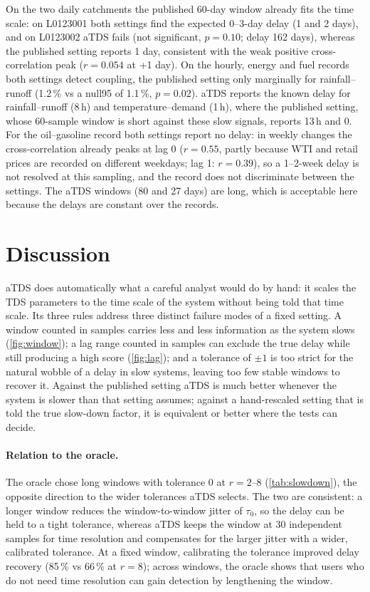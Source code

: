 \documentclass[11pt,a4paper]{article}
\begin{document}
On the two daily catchments the published 60-day window already fits the time scale: on L0123001 both settings find the expected 0--3-day delay (1 and 2 days), and on L0123002 aTDS fails (not significant, $p = 0.10$; delay 162 days), whereas the published setting reports 1 day, consistent with the weak positive cross-correlation peak ($r = 0.054$ at +1 day). On the hourly, energy and fuel records both settings detect coupling, the published setting only marginally for rainfall--runoff (1.2\,\% vs a null95 of 1.1\,\%, $p = 0.02$). aTDS reports the known delay for rainfall--runoff (8\,h) and temperature--demand (1\,h), where the published setting, whose 60-sample window is short against these slow signals, reports 13\,h and 0. For the oil--gasoline record both settings report no delay: in weekly changes the cross-correlation already peaks at lag 0 ($r = 0.55$, partly because WTI and retail prices are recorded on different weekdays; lag 1: $r = 0.39$), so a 1--2-week delay is not resolved at this sampling, and the record does not discriminate between the settings. The aTDS windows (80 and 27 days) are long, which is acceptable here because the delays are constant over the records.


\section{Discussion}
\label{sec:discussion}
aTDS does automatically what a careful analyst would do by hand: it scales the TDS parameters to the time scale of the system without being told that time scale. Its three rules address three distinct failure modes of a fixed setting. A window counted in samples carries less and less information as the system slows (\cref{fig:window}); a lag range counted in samples can exclude the true delay while still producing a high score (\cref{fig:lag}); and a tolerance of $\pm1$ is too strict for the natural wobble of a delay in slow systems, leaving too few stable windows to recover it. Against the published setting aTDS is much better whenever the system is slower than that setting assumes; against a hand-rescaled setting that is told the true slow-down factor, it is equivalent or better where the tests can decide.

\paragraph{Relation to the oracle.} The oracle chose long windows with tolerance 0 at $r = 2$--8 (\cref{tab:slowdown}), the opposite direction to the wider tolerances aTDS selects. The two are consistent: a longer window reduces the window-to-window jitter of $\tau_0$, so the delay can be held to a tight tolerance, whereas aTDS keeps the window at 30 independent samples for time resolution and compensates for the larger jitter with a wider, calibrated tolerance. At a fixed window, calibrating the tolerance improved delay recovery (85\,\% vs 66\,\% at $r = 8$); across windows, the oracle shows that users who do not need time resolution can gain detection by lengthening the window.
\end{document}
